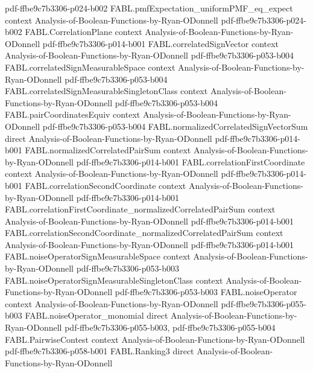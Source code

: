 \begin{theorem}
  {pdf-ffbe9c7b3306-p024-b002}
\proofstep
  {FABL.pmfExpectation_uniformPMF_eq_expect}
  {context}
  {Analysis-of-Boolean-Functions-by-Ryan-ODonnell}
  {pdf-ffbe9c7b3306-p024-b002}
\proofstep
  {FABL.CorrelationPlane}
  {context}
  {Analysis-of-Boolean-Functions-by-Ryan-ODonnell}
  {pdf-ffbe9c7b3306-p014-b001}
\proofstep
  {FABL.correlatedSignVector}
  {context}
  {Analysis-of-Boolean-Functions-by-Ryan-ODonnell}
  {pdf-ffbe9c7b3306-p053-b004}
\proofstep
  {FABL.correlatedSignMeasurableSpace}
  {context}
  {Analysis-of-Boolean-Functions-by-Ryan-ODonnell}
  {pdf-ffbe9c7b3306-p053-b004}
\proofstep
  {FABL.correlatedSignMeasurableSingletonClass}
  {context}
  {Analysis-of-Boolean-Functions-by-Ryan-ODonnell}
  {pdf-ffbe9c7b3306-p053-b004}
\proofstep
  {FABL.pairCoordinatesEquiv}
  {context}
  {Analysis-of-Boolean-Functions-by-Ryan-ODonnell}
  {pdf-ffbe9c7b3306-p053-b004}
\proofstep
  {FABL.normalizedCorrelatedSignVectorSum}
  {direct}
  {Analysis-of-Boolean-Functions-by-Ryan-ODonnell}
  {pdf-ffbe9c7b3306-p014-b001}
\proofstep
  {FABL.normalizedCorrelatedPairSum}
  {context}
  {Analysis-of-Boolean-Functions-by-Ryan-ODonnell}
  {pdf-ffbe9c7b3306-p014-b001}
\proofstep
  {FABL.correlationFirstCoordinate}
  {context}
  {Analysis-of-Boolean-Functions-by-Ryan-ODonnell}
  {pdf-ffbe9c7b3306-p014-b001}
\proofstep
  {FABL.correlationSecondCoordinate}
  {context}
  {Analysis-of-Boolean-Functions-by-Ryan-ODonnell}
  {pdf-ffbe9c7b3306-p014-b001}
\proofstep
  {FABL.correlationFirstCoordinate_normalizedCorrelatedPairSum}
  {context}
  {Analysis-of-Boolean-Functions-by-Ryan-ODonnell}
  {pdf-ffbe9c7b3306-p014-b001}
\proofstep
  {FABL.correlationSecondCoordinate_normalizedCorrelatedPairSum}
  {context}
  {Analysis-of-Boolean-Functions-by-Ryan-ODonnell}
  {pdf-ffbe9c7b3306-p014-b001}
\proofstep
  {FABL.noiseOperatorSignMeasurableSpace}
  {context}
  {Analysis-of-Boolean-Functions-by-Ryan-ODonnell}
  {pdf-ffbe9c7b3306-p053-b003}
\proofstep
  {FABL.noiseOperatorSignMeasurableSingletonClass}
  {context}
  {Analysis-of-Boolean-Functions-by-Ryan-ODonnell}
  {pdf-ffbe9c7b3306-p053-b003}
\proofstep
  {FABL.noiseOperator}
  {context}
  {Analysis-of-Boolean-Functions-by-Ryan-ODonnell}
  {pdf-ffbe9c7b3306-p055-b003}
\proofstep
  {FABL.noiseOperator_monomial}
  {direct}
  {Analysis-of-Boolean-Functions-by-Ryan-ODonnell}
  {pdf-ffbe9c7b3306-p055-b003,
    pdf-ffbe9c7b3306-p055-b004}
\proofstep
  {FABL.PairwiseContest}
  {context}
  {Analysis-of-Boolean-Functions-by-Ryan-ODonnell}
  {pdf-ffbe9c7b3306-p058-b001}
\proofstep
  {FABL.Ranking3}
  {direct}
  {Analysis-of-Boolean-Functions-by-Ryan-ODonnell}

\end{theorem}
